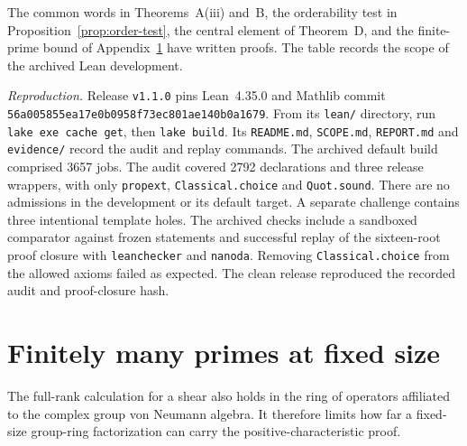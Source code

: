 \documentclass[11pt,a4paper]{article}
\numberwithin{equation}{section}
\begin{document}
The common words in Theorems~A(iii) and~B, the orderability test in Proposition~\ref{prop:order-test}, the central element of Theorem~D, and the finite-prime bound of Appendix~\ref{app:fixed-primes} have written proofs. The table records the scope of the archived Lean development.

\medskip
\noindent\textit{Reproduction.}
Release \texttt{v1.1.0} pins Lean~4.35.0 and Mathlib commit
\texttt{56a005855ea17e0b0958f7\allowbreak 3ec801ae140b0a1679}.
From its \texttt{lean/} directory, run \texttt{lake exe cache get}, then
\texttt{lake build}. Its \texttt{README.md}, \texttt{SCOPE.md},
\texttt{REPORT.md} and \texttt{evidence/} record the audit and replay
commands. The archived default build comprised 3657 jobs. The audit
covered 2792 declarations and three release wrappers, with only
\texttt{propext}, \texttt{Classical.choice} and \texttt{Quot.sound}.
There are no admissions in the development or its default target. A
separate challenge contains three intentional template holes. The archived
checks include a sandboxed comparator against frozen statements and
successful replay of the sixteen-root proof closure with \texttt{leanchecker}
and \texttt{nanoda}. Removing \texttt{Classical.choice} from the allowed
axioms failed as expected. The clean release reproduced the recorded audit
and proof-closure hash.

\section{Finitely many primes at fixed size}\label{app:fixed-primes}
The full-rank calculation for a shear also holds in the ring of operators affiliated to the complex group von Neumann algebra. It therefore limits how far a fixed-size group-ring factorization can carry the positive-characteristic proof.
\end{document}
